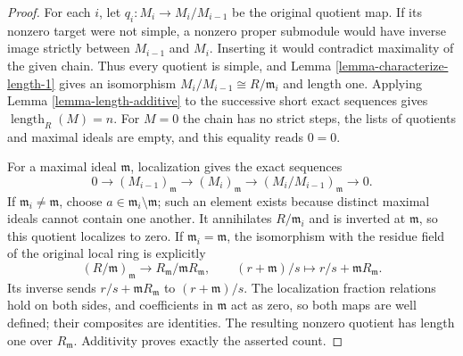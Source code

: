 \begin{proof}
For each $i$, let $q_i:M_i\to M_i/M_{i-1}$ be the original
quotient map. If its nonzero target were not simple, a nonzero
proper submodule would have inverse image strictly between
$M_{i-1}$ and $M_i$. Inserting it would contradict maximality
of the given chain. Thus every quotient is simple, and
Lemma \ref{lemma-characterize-length-1} gives an isomorphism
$M_i/M_{i-1}\cong R/\mathfrak m_i$ and length one.
Applying Lemma \ref{lemma-length-additive} to the successive
short exact sequences gives $\operatorname{length}_R(M)=n$.
For $M=0$ the chain has no strict steps, the lists of quotients
and maximal ideals are empty, and this equality reads $0=0$.

For a maximal ideal $\mathfrak m$, localization gives the exact sequences
$$
0\longrightarrow(M_{i-1})_{\mathfrak m}
\longrightarrow(M_i)_{\mathfrak m}
\longrightarrow(M_i/M_{i-1})_{\mathfrak m}
\longrightarrow0.
$$
If $\mathfrak m_i\neq\mathfrak m$, choose
$a\in\mathfrak m_i\setminus\mathfrak m$; such an element exists
because distinct maximal ideals cannot contain one another.
It annihilates $R/\mathfrak m_i$ and is inverted at
$\mathfrak m$, so this quotient localizes to zero.
If $\mathfrak m_i=\mathfrak m$, the isomorphism with the
residue field of the original local ring is explicitly
$$
(R/\mathfrak m)_{\mathfrak m}
\longrightarrow R_{\mathfrak m}/\mathfrak mR_{\mathfrak m},
\qquad
(r+\mathfrak m)/s\longmapsto r/s+\mathfrak mR_{\mathfrak m}.
$$
Its inverse sends $r/s+\mathfrak mR_{\mathfrak m}$ to
$(r+\mathfrak m)/s$. The localization fraction relations hold
on both sides, and coefficients in $\mathfrak m$ act as zero,
so both maps are well defined; their composites are identities.
The resulting nonzero quotient has length one over $R_{\mathfrak m}$.
Additivity proves exactly the asserted count.


\end{proof}
